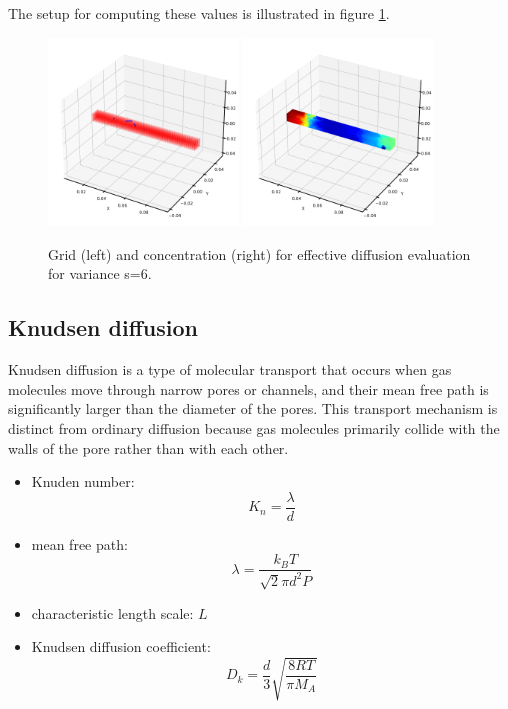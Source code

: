 \documentclass{article}
\begin{document}
The setup for computing these values is illustrated in figure \ref{fig:EffDiffVsKdVar3Dsetup}.
\begin{figure}[htbp!]
    \centering
    \includegraphics[width=0.45\textwidth]{images/fromOpenPNM/Grid3D100x10x10.png}
    \hspace{0.05\textwidth}
    \includegraphics[width=0.45\textwidth]{images/fromOpenPNM/ConcGrid3D100x10x10.png}
    \caption{Grid (left) and concentration (right) for effective diffusion evaluation for variance s=6.}
    \label{fig:EffDiffVsKdVar3Dsetup}
\end{figure}

\FloatBarrier  %
\subsection{Knudsen diffusion}
Knudsen diffusion is a type of molecular transport that occurs when gas molecules move through narrow pores or channels, and their mean free path is significantly larger than the diameter of the pores. This transport mechanism is distinct from ordinary diffusion because gas molecules primarily collide with the walls of the pore rather than with each other.
\begin{itemize}
    \item Knuden number: \[ K_n = \frac{\lambda}{d} \]
    \item mean free path: \[ \lambda = \frac{k_B T}{\sqrt{2} \pi d^2 P} \]
    \item characteristic length scale: $L$
    \item Knudsen diffusion coefficient: \[ D_k = \frac{d}{3} \sqrt{\frac{8 R T}{\pi M_A}} \]
\end{itemize}
\end{document}

